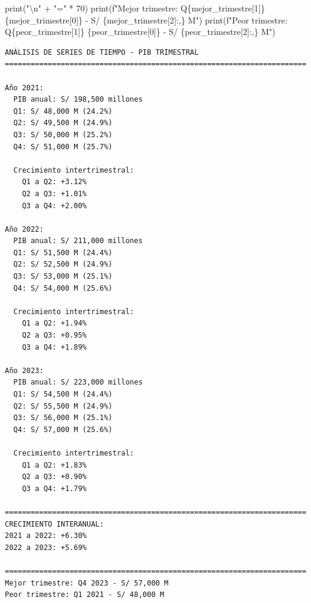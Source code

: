 \documentclass[
  doc,
  floatsintext,
  longtable,
  a4paper,
  nolmodern,
  notxfonts,
  notimes,
  12pt,
  colorlinks=true,linkcolor=blue,citecolor=blue,urlcolor=blue]{apa7}
\newenvironment{Shaded}{\begin{snugshade}}{\end{snugshade}}
\newcommand{\BuiltInTok}[1]{\textcolor[rgb]{0.00,0.23,0.31}{#1}}
\newcommand{\CharTok}[1]{\textcolor[rgb]{0.13,0.47,0.30}{#1}}
\newcommand{\DecValTok}[1]{\textcolor[rgb]{0.68,0.00,0.00}{#1}}
\newcommand{\NormalTok}[1]{\textcolor[rgb]{0.00,0.23,0.31}{#1}}
\newcommand{\OperatorTok}[1]{\textcolor[rgb]{0.37,0.37,0.37}{#1}}
\newcommand{\SpecialCharTok}[1]{\textcolor[rgb]{0.37,0.37,0.37}{#1}}
\newcommand{\SpecialStringTok}[1]{\textcolor[rgb]{0.13,0.47,0.30}{#1}}
\newcommand{\StringTok}[1]{\textcolor[rgb]{0.13,0.47,0.30}{#1}}
\begin{document}
\begin{Shaded}
\begin{Highlighting}[]
\BuiltInTok{print}\NormalTok{(}\StringTok{"}\CharTok{\textbackslash{}n}\StringTok{"} \OperatorTok{+} \StringTok{"="} \OperatorTok{*} \DecValTok{70}\NormalTok{)}
\BuiltInTok{print}\NormalTok{(}\SpecialStringTok{f"Mejor trimestre: Q}\SpecialCharTok{\{}\NormalTok{mejor\_trimestre[}\DecValTok{1}\NormalTok{]}\SpecialCharTok{\}}\SpecialStringTok{ }\SpecialCharTok{\{}\NormalTok{mejor\_trimestre[}\DecValTok{0}\NormalTok{]}\SpecialCharTok{\}}\SpecialStringTok{ {-} S/ }\SpecialCharTok{\{}\NormalTok{mejor\_trimestre[}\DecValTok{2}\NormalTok{]}\SpecialCharTok{:,\}}\SpecialStringTok{ M"}\NormalTok{)}
\BuiltInTok{print}\NormalTok{(}\SpecialStringTok{f"Peor trimestre: Q}\SpecialCharTok{\{}\NormalTok{peor\_trimestre[}\DecValTok{1}\NormalTok{]}\SpecialCharTok{\}}\SpecialStringTok{ }\SpecialCharTok{\{}\NormalTok{peor\_trimestre[}\DecValTok{0}\NormalTok{]}\SpecialCharTok{\}}\SpecialStringTok{ {-} S/ }\SpecialCharTok{\{}\NormalTok{peor\_trimestre[}\DecValTok{2}\NormalTok{]}\SpecialCharTok{:,\}}\SpecialStringTok{ M"}\NormalTok{)}
\end{Highlighting}
\end{Shaded}

\begin{verbatim}
ANÁLISIS DE SERIES DE TIEMPO - PIB TRIMESTRAL
======================================================================

Año 2021:
  PIB anual: S/ 198,500 millones
  Q1: S/ 48,000 M (24.2%)
  Q2: S/ 49,500 M (24.9%)
  Q3: S/ 50,000 M (25.2%)
  Q4: S/ 51,000 M (25.7%)

  Crecimiento intertrimestral:
    Q1 a Q2: +3.12%
    Q2 a Q3: +1.01%
    Q3 a Q4: +2.00%

Año 2022:
  PIB anual: S/ 211,000 millones
  Q1: S/ 51,500 M (24.4%)
  Q2: S/ 52,500 M (24.9%)
  Q3: S/ 53,000 M (25.1%)
  Q4: S/ 54,000 M (25.6%)

  Crecimiento intertrimestral:
    Q1 a Q2: +1.94%
    Q2 a Q3: +0.95%
    Q3 a Q4: +1.89%

Año 2023:
  PIB anual: S/ 223,000 millones
  Q1: S/ 54,500 M (24.4%)
  Q2: S/ 55,500 M (24.9%)
  Q3: S/ 56,000 M (25.1%)
  Q4: S/ 57,000 M (25.6%)

  Crecimiento intertrimestral:
    Q1 a Q2: +1.83%
    Q2 a Q3: +0.90%
    Q3 a Q4: +1.79%

======================================================================
CRECIMIENTO INTERANUAL:
2021 a 2022: +6.30%
2022 a 2023: +5.69%

======================================================================
Mejor trimestre: Q4 2023 - S/ 57,000 M
Peor trimestre: Q1 2021 - S/ 48,000 M
\end{verbatim}
\end{document}
